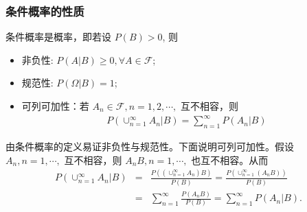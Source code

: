 \documentclass[Prob-All.tex]{subfiles}
\begin{document}
\begin{frame}
	\frametitle{条件概率的性质}
	\begin{thm}
		条件概率是概率，即若设 $P(B)>0$, 则
		\begin{itemize}[<+-|alert@+>]
			\item 非负性: $P (A|B)\geq 0, \forall A\in\mathcal{F}$;
			\item 规范性: $P (\Omega|B)=1$;
			\item 可列可加性：若 $A_n\in \mathcal{F}, n=1,2,\cdots,$ 互不相容，则
			\begin{eqnarray*}
				P(\cup_{n=1}^\infty A_n|B)=\sum_{n=1}^\infty P(A_n|B)
			\end{eqnarray*}

		\end{itemize}
	\end{thm}

	\pause \zheng 由条件概率的定义易证非负性与规范性。下面说明可列可加性。假设 $A_n,n=1,\cdots,$ 互不相容，则 $A_nB, n=1,\cdots,$ 也互不相容。从而
	\begin{eqnarray*}
		P(\cup_{n=1}^\infty A_n|B)&=&\frac{P((\cup_{n=1}^\infty A_n)B)}{P(B)}=\frac{P(\cup_{n=1}^\infty (A_nB))}{P(B)}\\
		&=&\sum_{n=1}^\infty \frac{P(A_nB)}{P(B)}=\sum_{n=1}^\infty P(A_n|B).
	\end{eqnarray*}
\end{frame}
\end{document}
